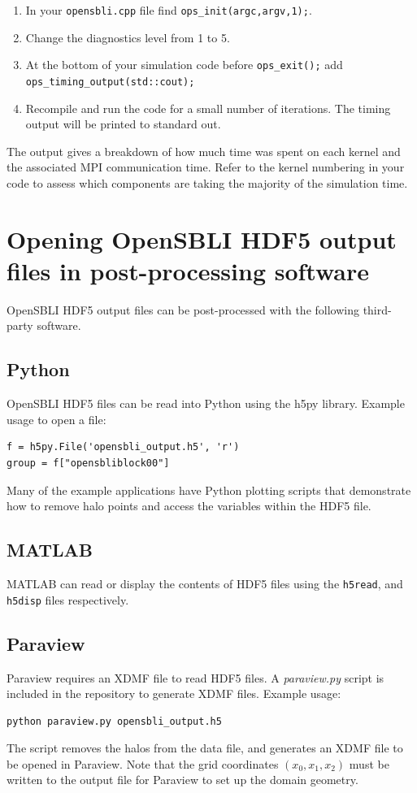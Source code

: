 \documentclass[11pt]{article}
\begin{document}
\begin{enumerate}
\item{In your \verb|opensbli.cpp| file find \verb|ops_init(argc,argv,1);|.}
\item{Change the diagnostics level from 1 to 5.}
\item{At the bottom of your simulation code before \verb|ops_exit();| add \verb|ops_timing_output(std::cout);|}
\item{Recompile and run the code for a small number of iterations. The timing output will be printed to standard out.}
\end{enumerate}

The output gives a breakdown of how much time was spent on each kernel and the associated MPI communication time. Refer to the kernel numbering in your code to assess which components are taking the majority of the simulation time.

\section{Opening OpenSBLI HDF5 output files in post-processing software}
OpenSBLI HDF5 output files can be post-processed with the following third-party software.
\subsection{Python}
OpenSBLI HDF5 files can be read into Python using the h5py library. Example usage to open a file:
\begin{lstlisting}
f = h5py.File('opensbli_output.h5', 'r')
group = f["opensbliblock00"]
\end{lstlisting}
Many of the example applications have Python plotting scripts that demonstrate how to remove halo points and access the variables within the HDF5 file.

\subsection{MATLAB}
MATLAB can read or display the contents of HDF5 files using the \verb|h5read|, and \verb|h5disp| files respectively.

\subsection{Paraview}
Paraview requires an XDMF file to read HDF5 files. A \textit{paraview.py} script is included in the repository to generate XDMF files. Example usage:
\begin{lstlisting}
python paraview.py opensbli_output.h5
\end{lstlisting}
The script removes the halos from the data file, and generates an XDMF file to be opened in Paraview. Note that the grid coordinates $(x_0, x_1, x_2)$ must be written to the output file for Paraview to set up the domain geometry.
\end{document}
